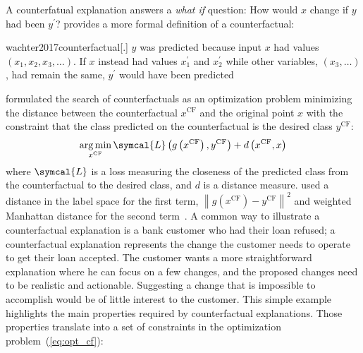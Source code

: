\documentclass[../main.tex]{subfiles}
\begin{document}
	A counterfatual explanation answers a \emph{what if} question: How would \(x\) change if \(y\) had been \(y^{\prime}\)?
	\citeauthor{wachter2017counterfactual} provides a more formal definition of a counterfactual:
	\begin{displaycquote}{wachter2017counterfactual}[.]
	    \(y\) was predicted because input \(x\) had values \(\left(x_{1}, x_{2}, x_{3}, \ldots\right)\). If \(x\) instead had values \(x_{1}^{\prime}\) and \(x_{2}^{\prime}\) while other variables, \(\left(x_{3}, \ldots\right)\), had remain the same, \(y^{\prime}\) would have been predicted
	\end{displaycquote}
	\citeauthor{wachter2017counterfactual} formulated the search of counterfactuals as an optimization problem minimizing the distance between the counterfactual \(x^{\text{CF}}\) and the original point \(x\) with the constraint that the class predicted on the counterfactual is the desired class \(y^{\text{CF}}\):
	\begin{equation}
	    \argmin_{x^{\text{CF}}} \symcal{L}\left(g\left(x^{\text{CF}}\right), y^{\text{CF}} \right) + d\left(x^{\text{CF}}, x\right)\label{eq:opt_cf}
	\end{equation}
	where \(\symcal{L}\) is a loss measuring the closeness of the predicted class from the counterfactual to the desired class, and \(d\) is a distance measure.
	\citeauthor{wachter2017counterfactual} used a distance in the label space for the first term, \({\left\|g\left(x^{\text{CF}}\right) - y^{\text{CF}}\right\|}^{2}\) and weighted Manhattan distance for the second term~\cite{wachter2017counterfactual}.
	A common way to illustrate a counterfactual explanation is a bank customer who had their loan refused; a counterfactual explanation represents the change the customer needs to operate to get their loan accepted.
	The customer wants a more straightforward explanation where he can focus on a few changes, and the proposed changes need to be realistic and actionable.
	Suggesting a change that is impossible to accomplish would be of little interest to the customer.
	This simple example highlights the main properties required by counterfactual explanations.
	Those properties translate into a set of constraints in the optimization problem~(\cref{eq:opt_cf}):
\end{document}
